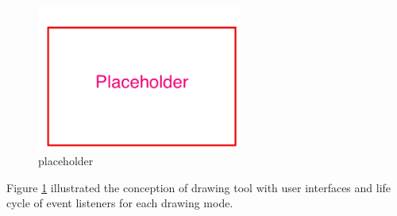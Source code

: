 \begin{figure}[!htbp]
  \centering
    \includegraphics[width=0.6\textwidth]{Figures/placeholder.png}
  \caption{placeholder}
  \label{fig:drawing-tool-concept}
\end{figure}

Figure \ref{fig:drawing-tool-concept} illustrated the conception of drawing tool with user interfaces and life cycle of event listeners for each drawing mode.